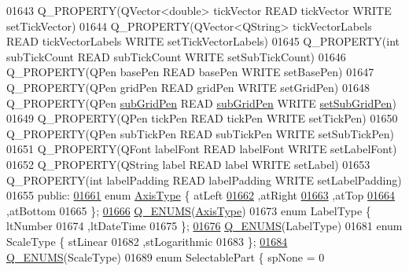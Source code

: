 \begin{DoxyCode}
01643   Q\_PROPERTY(QVector<double> tickVector READ tickVector WRITE setTickVector)
01644   Q\_PROPERTY(QVector<QString> tickVectorLabels READ tickVectorLabels WRITE setTickVectorLabels)
01645   Q\_PROPERTY(\textcolor{keywordtype}{int} subTickCount READ subTickCount WRITE setSubTickCount)
01646   Q\_PROPERTY(QPen basePen READ basePen WRITE setBasePen)
01647   Q\_PROPERTY(QPen gridPen READ gridPen WRITE setGridPen)
01648   Q\_PROPERTY(QPen \hyperlink{a00116_ab370d307e2e1dab54e5f25349142fa63}{subGridPen} READ \hyperlink{a00116_ab370d307e2e1dab54e5f25349142fa63}{subGridPen} WRITE 
      \hyperlink{a00116_a48c20da07dee569fc3acae82c9278fa7}{setSubGridPen})
01649   Q\_PROPERTY(QPen tickPen READ tickPen WRITE setTickPen)
01650   Q\_PROPERTY(QPen subTickPen READ subTickPen WRITE setSubTickPen)
01651   Q\_PROPERTY(QFont labelFont READ labelFont WRITE setLabelFont)
01652   Q\_PROPERTY(QString label READ label WRITE setLabel)
01653   Q\_PROPERTY(\textcolor{keywordtype}{int} labelPadding READ labelPadding WRITE setLabelPadding)
01655 \textcolor{keyword}{public}:
\hypertarget{a00116_source_l01661}{}\hyperlink{a00025_ae2bcc1728b382f10f064612b368bc18a}{01661}   \textcolor{keyword}{enum} \hyperlink{a00025_ae2bcc1728b382f10f064612b368bc18a}{AxisType} \{ atLeft    
\hypertarget{a00116_source_l01662}{}\hyperlink{a00025_ae2bcc1728b382f10f064612b368bc18aadf5509f7d29199ef2f263b1dd224b345}{01662}                   ,atRight  
\hypertarget{a00116_source_l01663}{}\hyperlink{a00025_ae2bcc1728b382f10f064612b368bc18aac0ece2b680d3f545e701f75af1655977}{01663}                   ,atTop    
\hypertarget{a00116_source_l01664}{}\hyperlink{a00025_ae2bcc1728b382f10f064612b368bc18aa220d68888516b6c3b493d144f1ba438f}{01664}                   ,atBottom 
01665                 \};
\hypertarget{a00116_source_l01666}{}\hyperlink{a00025_a990f4607ce03e7420b8f854b3b8c5cbe}{01666}   \hyperlink{a00025_a990f4607ce03e7420b8f854b3b8c5cbe}{Q\_ENUMS}(\hyperlink{a00025_ae2bcc1728b382f10f064612b368bc18a}{AxisType})
01673   enum LabelType \{ ltNumber    
01674                    ,ltDateTime 
01675                  \};
\hypertarget{a00116_source_l01676}{}\hyperlink{a00025_a25657c6590e887bdd00e0d516c56bb7c}{01676}   \hyperlink{a00025_a25657c6590e887bdd00e0d516c56bb7c}{Q\_ENUMS}(LabelType)
01681   enum ScaleType \{ stLinear       
01682                    ,stLogarithmic 
01683                  \};
\hypertarget{a00116_source_l01684}{}\hyperlink{a00025_a3ac428eeccb457b8de85abec4a9ceea2}{01684}   \hyperlink{a00025_a3ac428eeccb457b8de85abec4a9ceea2}{Q\_ENUMS}(ScaleType)
01689   enum SelectablePart \{ spNone        = 0      

\end{DoxyCode}

